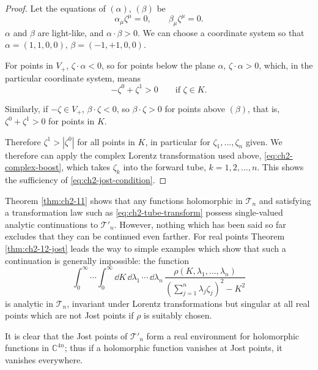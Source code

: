 \begin{proof}
Let the equations of $(\alpha)$, $(\beta)$ be
\begin{equation*}
  \alpha_{\mu}\zeta^{\mu}=0,\qquad \beta_{\mu}\zeta^{\mu}=0 .
\end{equation*}
$\alpha$ and $\beta$ are light-like, and $\alpha\mathbin{\cdot}\beta>0$.
We can choose a coordinate system so that
$\alpha=(1,1,0,0)$, $\beta=(-1,+1,0,0)$.

For points in $V_{+}$, $\zeta\mathbin{\cdot}\alpha<0$, so for points below the
plane $\alpha$, $\zeta\mathbin{\cdot}\alpha>0$, which, in the particular
coordinate system, means
\begin{equation*}
  -\zeta^0+\zeta^1>0\qquad\text{if }\zeta\in K .
\end{equation*}

Similarly, if $-\zeta\in V_{+}$, $\beta\mathbin{\cdot}\zeta<0$, so
$\beta\mathbin{\cdot}\zeta>0$ for points above $(\beta)$, that is,
$\zeta^0+\zeta^1>0$ for points in $K$.

Therefore $\zeta^1>|\zeta^0|$ for all points in $K$, in particular for
$\zeta_1,\ldots,\zeta_n$ given.  We therefore can apply the complex Lorentz
transformation used above, \eqref{eq:ch2-complex-boost}, which takes $\zeta_k$ into the forward
tube, $k=1,2,\ldots,n$.  This shows the sufficiency of \eqref{eq:ch2-jost-condition}.
\end{proof}

Theorem \ref{thm:ch2-11} shows that any functions holomorphic in $\mathcal{T}_{n}$ and
satisfying a transformation law such as \eqref{eq:ch2-tube-transform} possess single-valued analytic
continuations to $\mathcal{T}'_{n}$.  However, nothing which has been said so
far excludes that they can be continued even farther.  For
%
real points Theorem \ref{thm:ch2-12-jost} leads the way to simple examples which show that
such a continuation is generally impossible: the function
\begin{equation*}
  \int_{0}^{\infty}\!\cdots\!\int_{0}^{\infty}
  \dd K\,\dd\lambda_1\,\cdots\,\dd\lambda_n\,
  \frac{\rho(K,\lambda_1,\ldots,\lambda_n)}
  {\left(\displaystyle\sum_{j=1}^{n}\lambda_j\zeta_j\right)^2-K^2}
\end{equation*}
is analytic in $\mathcal{T}_{n}$, invariant under Lorentz transformations but
singular at all real points which are not Jost points if $\rho$ is suitably
chosen.

It is clear that the Jost points of $\mathcal{T}'_{n}$ form a real environment
for holomorphic functions in $\mathbb C^{4n}$; thus if a holomorphic function
vanishes at Jost points, it vanishes everywhere.

